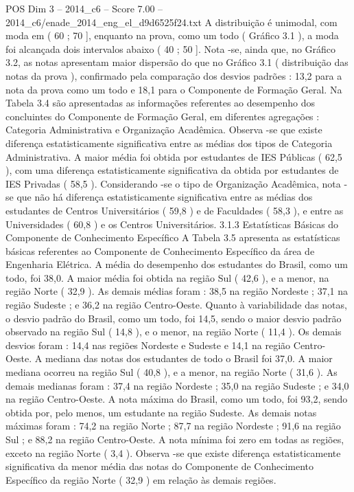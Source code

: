 \begin{textsample}{POS Dim 3 – 2014\_c6 – Score 7.00 – 2014\_c6/enade\_2014\_eng\_el\_d9d6525f24.txt}
A distribuição é unimodal, com moda em ( 60 ; 70 ], enquanto na prova, como um todo ( Gráfico 3.1 ), a moda foi alcançada dois intervalos abaixo ( 40 ; 50 ].
Nota -se, ainda que, no Gráfico 3.2, as notas apresentam maior dispersão do que no Gráfico 3.1 ( distribuição das notas da prova ), confirmado pela comparação dos desvios padrões : 13,2 para a nota da prova como um todo e 18,1 para o Componente de Formação Geral.
Na Tabela 3.4 são apresentadas as informações referentes ao desempenho dos concluintes do Componente de Formação Geral, em diferentes agregações : Categoria Administrativa e Organização Acadêmica.
Observa -se que existe diferença estatisticamente significativa entre as médias dos tipos de Categoria Administrativa.
A maior média foi obtida por estudantes de IES Públicas ( 62,5 ), com uma diferença estatisticamente significativa da obtida por estudantes de IES Privadas ( 58,5 ).
Considerando -se o tipo de Organização Acadêmica, nota -se que não há diferença estatisticamente significativa entre as médias dos estudantes de Centros Universitários ( 59,8 ) e de Faculdades ( 58,3 ), e entre as Universidades ( 60,8 ) e os Centros Universitários. 3.1.3 Estatísticas Básicas do Componente de Conhecimento Específico A Tabela 3.5 apresenta as estatísticas básicas referentes ao Componente de Conhecimento Específico da área de Engenharia Elétrica.
A média do desempenho dos estudantes do Brasil, como um todo, foi 38,0.
A maior média foi obtida na região Sul ( 42,6 ), e a menor, na região Norte ( 32,9 ).
As demais médias foram : 38,5 na região Nordeste ; 37,1 na região Sudeste ; e 36,2 na região Centro-Oeste.
Quanto à variabilidade das notas, o desvio padrão do Brasil, como um todo, foi 14,5, sendo o maior desvio padrão observado na região Sul ( 14,8 ), e o menor, na região Norte ( 11,4 ).
Os demais desvios foram : 14,4 nas regiões Nordeste e Sudeste e 14,1 na região Centro-Oeste.
A mediana das notas dos estudantes de todo o Brasil foi 37,0.
A maior mediana ocorreu na região Sul ( 40,8 ), e a menor, na região Norte ( 31,6 ).
As demais medianas foram : 37,4 na região Nordeste ; 35,0 na região Sudeste ; e 34,0 na região Centro-Oeste.
A nota máxima do Brasil, como um todo, foi 93,2, sendo obtida por, pelo menos, um estudante na região Sudeste.
As demais notas máximas foram : 74,2 na região Norte ; 87,7 na região Nordeste ; 91,6 na região Sul ; e 88,2 na região Centro-Oeste.
A nota mínima foi zero em todas as regiões, exceto na região Norte ( 3,4 ).
Observa -se que existe diferença estatisticamente significativa da menor média das notas do Componente de Conhecimento Específico da região Norte ( 32,9 ) em relação às demais regiões.

\end{textsample}

